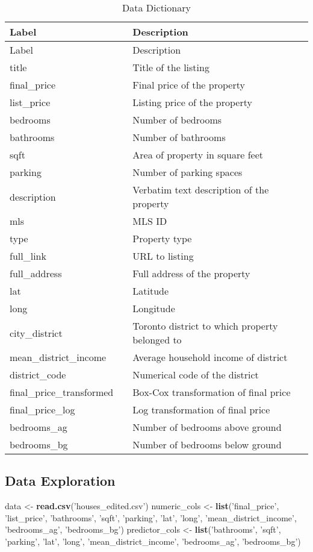 \documentclass[11pt,]{article}
\newenvironment{Shaded}{\begin{snugshade}}{\end{snugshade}}
\newcommand{\KeywordTok}[1]{\textcolor[rgb]{0.13,0.29,0.53}{\textbf{#1}}}
\newcommand{\NormalTok}[1]{#1}
\newcommand{\StringTok}[1]{\textcolor[rgb]{0.31,0.60,0.02}{#1}}
\begin{document}
\begin{longtable}[]{@{}lll@{}}
\caption{Data Dictionary}\tabularnewline
\toprule
Label & & Description\tabularnewline
\midrule
\endfirsthead
\toprule
Label & & Description\tabularnewline
\midrule
\endhead
title & & Title of the listing\tabularnewline
final\_price & & Final price of the property\tabularnewline
list\_price & & Listing price of the property\tabularnewline
bedrooms & & Number of bedrooms\tabularnewline
bathrooms & & Number of bathrooms\tabularnewline
sqft & & Area of property in square feet\tabularnewline
parking & & Number of parking spaces\tabularnewline
description & & Verbatim text description of the property\tabularnewline
mls & & MLS ID\tabularnewline
type & & Property type\tabularnewline
full\_link & & URL to listing\tabularnewline
full\_address & & Full address of the property\tabularnewline
lat & & Latitude\tabularnewline
long & & Longitude\tabularnewline
city\_district & & Toronto district to which property belonged
to\tabularnewline
mean\_district\_income & & Average household income of
district\tabularnewline
district\_code & & Numerical code of the district\tabularnewline
final\_price\_transformed & & Box-Cox transformation of final
price\tabularnewline
final\_price\_log & & Log transformation of final price\tabularnewline
bedrooms\_ag & & Number of bedrooms above ground\tabularnewline
bedrooms\_bg & & Number of bedrooms below ground\tabularnewline
\bottomrule
\end{longtable}

\hypertarget{data-exploration}{%
\subsection{Data Exploration}\label{data-exploration}}

\begin{Shaded}
\begin{Highlighting}[]
\NormalTok{data <-}\StringTok{ }\KeywordTok{read.csv}\NormalTok{(}\StringTok{'houses_edited.csv'}\NormalTok{)}
\NormalTok{numeric_cols <-}\StringTok{ }\KeywordTok{list}\NormalTok{(}\StringTok{'final_price'}\NormalTok{, }\StringTok{'list_price'}\NormalTok{, }\StringTok{'bathrooms'}\NormalTok{, }\StringTok{'sqft'}\NormalTok{, }\StringTok{'parking'}\NormalTok{, }\StringTok{'lat'}\NormalTok{, }\StringTok{'long'}\NormalTok{, }\StringTok{'mean_district_income'}\NormalTok{, }\StringTok{'bedrooms_ag'}\NormalTok{, }\StringTok{'bedrooms_bg'}\NormalTok{)}
\NormalTok{predictor_cols <-}\StringTok{ }\KeywordTok{list}\NormalTok{(}\StringTok{'bathrooms'}\NormalTok{, }\StringTok{'sqft'}\NormalTok{, }\StringTok{'parking'}\NormalTok{, }\StringTok{'lat'}\NormalTok{, }\StringTok{'long'}\NormalTok{, }\StringTok{'mean_district_income'}\NormalTok{, }\StringTok{'bedrooms_ag'}\NormalTok{, }\StringTok{'bedrooms_bg'}\NormalTok{)}
\end{Highlighting}
\end{Shaded}
\end{document}
